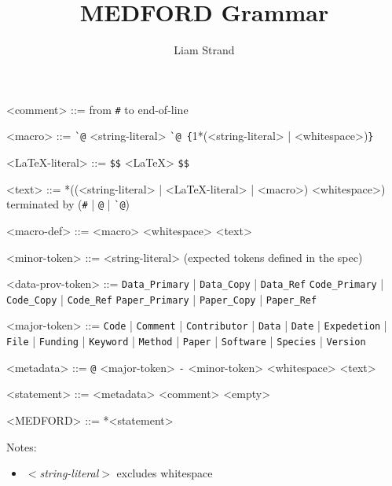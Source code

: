 \documentclass{article}
\begin{document}
\title{MEDFORD Grammar}
\date{}
\author{Liam Strand}
\maketitle

\setlength{\grammarindent}{10em} %

\newcommand{\ttt}[1]{\texttt{#1}}

\begin{grammar}

<comment> ::= from \ttt{\#} to end-of-line

<macro> ::= \ttt{\`{}@} <string-literal>
\alt \ttt{\`{}@ \{}1*(<string-literal> | <whitespace>)\ttt{\}}

<\LaTeX-literal> ::= \ttt{\$\$} <\LaTeX> \ttt{\$\$}

<text> ::= *((<string-literal> | <\LaTeX-literal> | <macro>) <whitespace>) 
terminated by (\ttt{\#} | \ttt{@} | \ttt{\`{}@})

<macro-def> ::= <macro> <whitespace> <text>

<minor-token> ::= <string-literal> (expected tokens defined in the spec)

<data-prov-token> ::= \ttt{Data\_Primary} | \ttt{Data\_Copy} | \ttt{Data\_Ref}
\alt \ttt{Code\_Primary} | \ttt{Code\_Copy} | \ttt{Code\_Ref}
\alt \ttt{Paper\_Primary} | \ttt{Paper\_Copy} | \ttt{Paper\_Ref}

<major-token> ::= \ttt{Code} | \ttt{Comment} | \ttt{Contributor} | \ttt{Data} | \ttt{Date} | \ttt{Expedetion} | \ttt{File} | \ttt{Funding} | \ttt{Keyword} | \ttt{Method} | \ttt{Paper} | \ttt{Software} | \ttt{Species} | \ttt{Version}

<metadata> ::= \ttt{@} <major-token> \ttt{-} <minor-token> <whitespace> <text>

<statement> ::= <metadata>
\alt <comment>
\alt <empty>

<MEDFORD> ::= *<statement>

\end{grammar}

\bigskip

Notes: 
\begin{itemize}
    \item \textit{\(<\)string-literal\(>\)} excludes whitespace
\end{itemize}

%  




\end{document}
